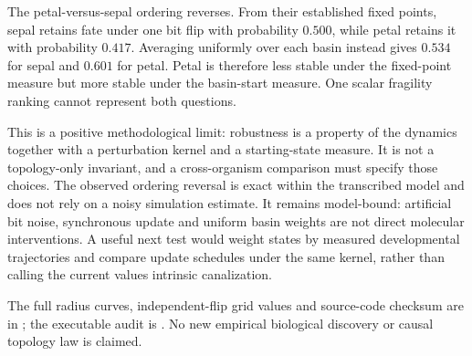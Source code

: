The petal-versus-sepal ordering reverses. From their established fixed points, sepal retains fate under one bit flip with probability $0.500$, while petal retains it with probability $0.417$. Averaging uniformly over each basin instead gives $0.534$ for sepal and $0.601$ for petal. Petal is therefore less stable under the fixed-point measure but more stable under the basin-start measure. One scalar fragility ranking cannot represent both questions.

This is a positive methodological limit: robustness is a property of the dynamics together with a perturbation kernel and a starting-state measure. It is not a topology-only invariant, and a cross-organism comparison must specify those choices. The observed ordering reversal is exact within the transcribed model and does not rely on a noisy simulation estimate. It remains model-bound: artificial bit noise, synchronous update and uniform basin weights are not direct molecular interventions. A useful next test would weight states by measured developmental trajectories and compare update schedules under the same kernel, rather than calling the current values intrinsic canalization.

The full radius curves, independent-flip grid values and source-code checksum are in ; the executable audit is . No new empirical biological discovery or causal topology law is claimed.
